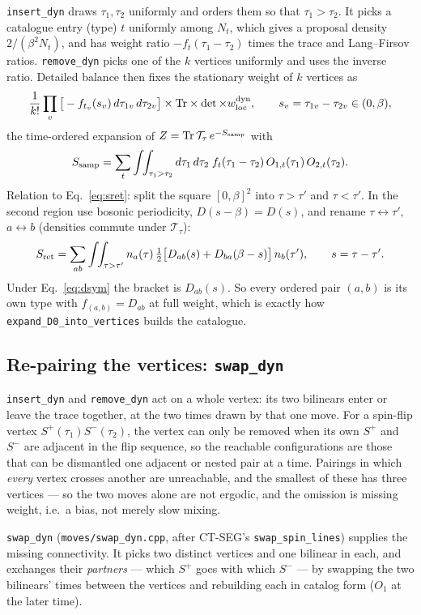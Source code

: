 \documentclass[a4paper,12pt]{article}
\renewcommand{\t}{\ensuremath{\tau}}
\newcommand{\TT}{\ensuremath{\mathcal{T}_\t}}
\begin{document}
\texttt{insert\_dyn} draws $\t_1,\t_2$ uniformly and orders them so that $\t_1>\t_2$. It
picks a catalogue entry (type) $t$ uniformly among $N_t$, which gives a proposal density
$2/(\beta^2N_t)$, and has weight ratio $-f_t(\t_1-\t_2)$ times the trace and Lang--Firsov
ratios. \texttt{remove\_dyn} picks one of the $k$ vertices uniformly and uses the
inverse ratio. Detailed balance then fixes the stationary weight of $k$ vertices as
\[
  \frac1{k!}\prod_{v}\big[-f_{t_v}(s_v)\,d\t_{1v}\,d\t_{2v}\big]\times
  \mathrm{Tr}\times\det\times w^{\rm dyn}_{\rm loc},\qquad s_v=\t_{1v}-\t_{2v}\in(0,\beta),
\]
the time-ordered expansion of $Z=\mathrm{Tr}\,\TT\,e^{-S_{\rm samp}}$ with
\begin{equation}
  S_{\rm samp}=\sum_t\int\!\!\int_{\t_1>\t_2}d\t_1\,d\t_2\;f_t(\t_1-\t_2)\,
  O_{1,t}(\t_1)\,O_{2,t}(\t_2).
  \label{eq:ssamp}
\end{equation}
Relation to Eq.~\eqref{eq:sret}: split the square $[0,\beta]^2$ into $\t>\t'$ and
$\t<\t'$. In the second region use bosonic periodicity, $D(s-\beta)=D(s)$, and rename
$\t\leftrightarrow\t'$, $a\leftrightarrow b$ (densities commute under $\TT$):
\[
  S_{\rm ret}=\sum_{ab}\int\!\!\int_{\t>\t'}n_a(\t)\,
  \tfrac12\big[D_{ab}(s)+D_{ba}(\beta-s)\big]\,n_b(\t'),\qquad s=\t-\t'.
\]
Under Eq.~\eqref{eq:dsym} the bracket is $D_{ab}(s)$. So every ordered pair $(a,b)$ is
its own type with $f_{(a,b)}=D_{ab}$ at full weight, which is exactly how
\texttt{expand\_D0\_into\_vertices} builds the catalogue.

\subsection{Re-pairing the vertices: \texttt{swap\_dyn}}
\label{sec:swap}

\texttt{insert\_dyn} and \texttt{remove\_dyn} act on a whole vertex: its two bilinears
enter or leave the trace together, at the two times drawn by that one move. For a
spin-flip vertex $S^+(\t_1)S^-(\t_2)$, the vertex can only be removed when its own $S^+$
and $S^-$ are adjacent in the flip sequence, so the reachable configurations are those
that can be dismantled one adjacent or nested pair at a time. Pairings in which
\emph{every} vertex crosses another are unreachable, and the smallest of these has three
vertices --- so the two moves alone are not ergodic, and the omission is missing weight,
i.e.\ a bias, not merely slow mixing.

\texttt{swap\_dyn} (\texttt{moves/swap\_dyn.cpp}, after CT-SEG's
\texttt{swap\_spin\_lines}) supplies the missing connectivity. It picks two distinct
vertices and one bilinear in each, and exchanges their \emph{partners} --- which $S^+$ goes
with which $S^-$ --- by swapping the two bilinears' times between the vertices and
rebuilding each in catalog form ($O_1$ at the later time).
\end{document}
